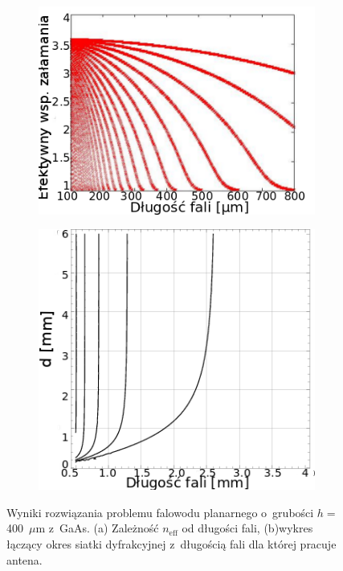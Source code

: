 \begin{figure}
\begin{subfigure}{0.5\textwidth}
        \includegraphics[width=\textwidth]{images/thz/gaas-neffeps.png}
	\caption{}
	\label{fig:gaas-effn}
\end{subfigure}
\begin{subfigure}{0.5\textwidth}
        \includegraphics[width=\textwidth]{images/antenaThz/d_lambda.png}
	\caption{}
	\label{fig:d-lusok}
\end{subfigure}
\caption{Wyniki rozwiązania problemu falowodu planarnego o~grubości $h=$400~$\mu$m z~GaAs.  (a) Zależność $n_{\textrm{eff}}$ od długości fali, (b)wykres łączący okres siatki dyfrakcyjnej z~długością fali dla której pracuje antena. }
\end{figure}



